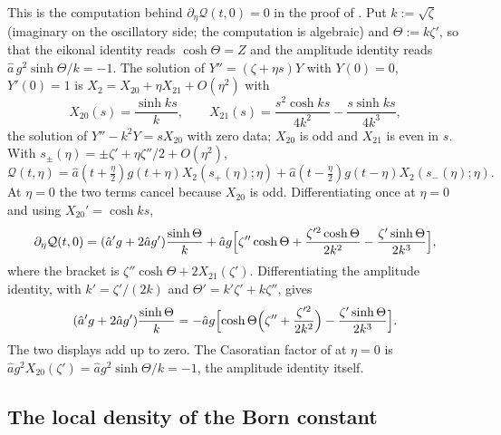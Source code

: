 This is the computation behind $\partial_\eta\mathcal Q(t,0)=0$ in the proof of . Put
$k:=\sqrt\zeta$ (imaginary on the oscillatory side; the computation is algebraic) and $\Theta:=k\zeta'$, so
that the eikonal identity reads $\cosh\Theta=Z$ and the amplitude identity reads
$\hat a\,g^2\sinh\Theta/k=-1$. The solution of $Y''=(\zeta+\eta s)Y$ with $Y(0)=0$, $Y'(0)=1$ is
$X_2=X_{20}+\eta X_{21}+O(\eta^2)$ with
\[
  X_{20}(s)=\frac{\sinh ks}{k},\qquad X_{21}(s)=\frac{s^2\cosh ks}{4k^2}-\frac{s\sinh ks}{4k^3},
\]
the solution of $Y''-k^2Y=sX_{20}$ with zero data; $X_{20}$ is odd and $X_{21}$ is even in $s$. With
$s_\pm(\eta)=\pm\zeta'+\eta\zeta''/2+O(\eta^2)$,
\[
  \mathcal Q(t,\eta)=\hat a(t+\tfrac\eta2)g(t+\eta)X_2(s_+(\eta);\eta)+\hat a(t-\tfrac\eta2)g(t-\eta)X_2(s_-(\eta);\eta).
\]
At $\eta=0$ the two terms cancel because $X_{20}$ is odd. Differentiating once at $\eta=0$ and using
$X_{20}'=\cosh ks$,
\[
  \partial_\eta\mathcal Q(t,0)=(\hat a'g+2\hat ag')\frac{\sinh\Theta}{k}
  +\hat ag\Bigl[\zeta''\cosh\Theta+\frac{\zeta'^2\cosh\Theta}{2k^2}-\frac{\zeta'\sinh\Theta}{2k^3}\Bigr],
\]
where the bracket is $\zeta''\cosh\Theta+2X_{21}(\zeta')$. Differentiating the amplitude identity, with
$k'=\zeta'/(2k)$ and $\Theta'=k'\zeta'+k\zeta''$, gives
\[
  (\hat a'g+2\hat ag')\frac{\sinh\Theta}{k}=-\hat ag\Bigl[\cosh\Theta\Bigl(\zeta''+\frac{\zeta'^2}{2k^2}\Bigr)-\frac{\zeta'\sinh\Theta}{2k^3}\Bigr].
\]
The two displays add up to zero. The Casoratian factor of  at $\eta=0$ is
$\hat ag^2X_{20}(\zeta')=\hat ag^2\sinh\Theta/k=-1$, the amplitude identity itself.

\subsection{The local density of the Born constant}\label{app:p2}

